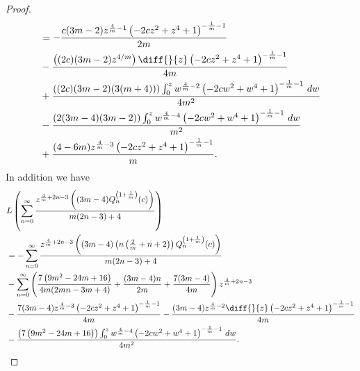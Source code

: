 \documentclass[review,nopreprintline]{elsarticle}
\theoremstyle{definition}
\numberwithin{equation}{section}
\theoremstyle{remark}
\begin{document}
\begin{proof}
\begin{align*}
	            &=-\frac{c (3 m-2) z^{\frac{4}{m}-1} \left(-2 c z^2+z^4+1\right)^{-\frac{1}{m}-1}}{2 m}\\
	            &-\frac{\left((2 c) (3 m-2) z^{4/m}\right) \diff{}{z}\left(-2 c z^2+z^4+1\right)^{-\frac{1}{m}-1}}{4 m}\\
	            &+\frac{((2 c) (3 m-2) (3 (m+4))) \int_{0}^z w^{\frac{4}{m}-2} \left(-2 c w^2+w^4+1\right)^{-\frac{1}{m}-1} \, dw}{4 m^2}\\
	            &-\frac{(2 (3 m-4) (3 m-2)) \int_{0}^z w^{\frac{4}{m}-4} \left(-2 c w^2+w^4+1\right)^{-\frac{1}{m}-1} \, dw}{m^2}\\
	            &+\frac{(4-6 m) z^{\frac{4}{m}-3} \left(-2 c z^2+z^4+1\right)^{-\frac{1}{m}-1}}{m}.
	        \end{align*}
	        In addition we have
	        \begin{align*}
	            &L \left(\sum _{n=0}^{\infty } \frac{z^{\frac{4}{m}+2 n-3} \left((3 m-4) Q_n^{\left(1+\frac{1}{m}\right)}(c)\right)}{m (2 n-3)+4}\right)\\
	            &=-\sum _{n=0}^{\infty } \frac{z^{\frac{4}{m}+2 n-3} \left((3 m-4) \left(n \left(\frac{2}{m}+n+2\right)\right) Q_n^{\left(1+\frac{1}{m}\right)}(c)\right)}{m (2 n-3)+4}\\
	            &-\sum _{n=0}^{\infty } \left(\frac{7 \left(9 m^2-24 m+16\right)}{4 m (2 m n-3 m+4)}+\frac{(3 m-4) n}{2 m}+\frac{7 (3 m-4)}{4 m}\right) z^{\frac{4}{m}+2 n-3}\\
	            &-\frac{7 (3 m-4) z^{\frac{4}{m}-3} \left(-2 c z^2+z^4+1\right)^{-\frac{1}{m}-1}}{4 m}-\frac{(3 m-4) z^{\frac{4}{m}-2} \diff{}{z}\left(-2 c z^2+z^4+1\right)^{-\frac{1}{m}-1}}{4 m}\\
	            &-\frac{\left(7 \left(9 m^2-24 m+16\right)\right) \int_{0}^z w^{\frac{4}{m}-4} \left(-2 c w^2+w^4+1\right)^{-\frac{1}{m}-1} \, dw}{4 m^2}.
	        \end{align*}

\end{proof}
\end{document}
